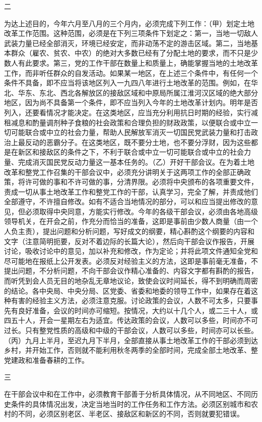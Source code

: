 \documentclass[UTF-8, a5paper, 12pt]{ctexart}
\begin{document}
二

为达上述目的，今年六月至八月的三个月内，必须完成下列工作：（甲）划定土地改革工作范围。这种范围，必须是在下列三项条件下划定之：第一，当地一切敌人武装力量已经全部消灭，环境已经安定，而非动荡不定的游击区域。第二，当地基本群众（雇农、贫农、中农）的绝对大多数已经有了分配土地的要求，而不只是少数人有此要求。第三，党的工作干部在数量上和质量上，确能掌握当地的土地改革工作，而非听任群众的自发活动。如果某一地区，在上述三个条件中，有任何一个条件不具备，即不应当将该地区列入一九四八年进行土地改革的范围。例如，在华北、华东、东北、西北各解放区的接敌区域和中原局所属江淮河汉区域的绝大部分地区，因为尚不具备第一个条件，即不应当列入今年的土地改革计划内。明年是否列入，还要看情况才能决定。在这类地区，应当充分利用抗日时期的经验，实行减租减息和酌量调剂种子食粮的社会政策和合理负担的财政政策，以便联合或中立一切可能联合或中立的社会力量，帮助人民解放军消灭一切国民党武装力量和打击政治上最反动的恶霸分子。在这类地区，既不要分土地，也不要分浮财，因为这些都是在新区和接敌区的条件之下，不利于联合或中立一切可能联合或中立的社会力量、完成消灭国民党反动力量这一基本任务的。（乙）开好干部会议。在为着土地改革和整党工作召集的干部会议中，必须充分讲明关于这两项工作的全部正确政策，将许可做的事和不许可做的事，分清界限。必须将中央颁布的各项重要文件，责成一切从事土地改革工作和整党工作的干部，认真学习，完全了解，并责成他们全部遵守，不许擅自修改。如有不适合当地情况的部分，可以和应当提出修改的意见，但必须取得中央同意，方能实行修改。今年的各级干部会议，必须由各地高级领导机关，在开会之前，作充分而恰当的准备，这即是事前由少数人商量（由一个人负主责），提出问题和分析问题，写好成文的纲要，精心斟酌这个纲要的内容和文字（注意简明扼要，反对不着边际的长篇大论），然后向干部会议作报告，开展讨论，吸收讨论中的意见，加以补充和修改，作为定论；并将此项文件通知全党和尽可能地在报纸上公开发表。必须反对经验主义的方法，这即是事前毫无准备，不提出问题，不分析问题，不向干部会议作精心准备的、内容文字都有斟酌的报告，而听凭到会人员无目的地杂乱无章地议论，致使会议时间延长，得不到明确而周密的结论。各中央局、中央分局、区党委、省委和地委的领导工作中，如果存在着这种有害的经验主义方法，必须注意克服。讨论政策的会议，人数不可太多，只要事先有良好准备，会议的时间亦可缩短。按情况，大约以十几个人，或二三十人，或四五十人，开会一星期左右为适宜。传达政策的会议，人数可以多些，时间亦不可过长。只有整党性质的高级和中级的干部会议，人数可以多些，时间亦可以长些。（丙）九月上半月，至迟九月下半月，全部直接从事土地改革工作的干部必须到达乡村，并开始工作，否则就不能利用秋冬两季的全部时间，完成全部土地改革、整党建政和准备春耕的工作。

三

在干部会议中和在工作中，必须教育干部善于分析具体情况，从不同地区、不同历史条件的具体情况出发，决定当地当时的工作任务和工作方法。必须区别城市和农村的不同，必须区别老区、半老区、接敌区和新区的不同，否则就要犯错误。
\end{document}
